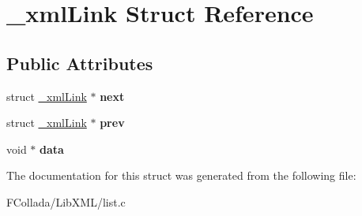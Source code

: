 \hypertarget{struct__xmlLink}{
\section{\_\-xmlLink Struct Reference}
\label{struct__xmlLink}
}
\subsection*{Public Attributes}
\begin{DoxyCompactItemize}
\item 
\hypertarget{struct__xmlLink_a9757f4af7556432076b1e4a85ba1e877}{
struct \hyperlink{struct__xmlLink}{\_\-xmlLink} $\ast$ {\bfseries next}}
\label{struct__xmlLink_a9757f4af7556432076b1e4a85ba1e877}

\item 
\hypertarget{struct__xmlLink_acb00bdb2cc98cd2c1a5037d86fac2917}{
struct \hyperlink{struct__xmlLink}{\_\-xmlLink} $\ast$ {\bfseries prev}}
\label{struct__xmlLink_acb00bdb2cc98cd2c1a5037d86fac2917}

\item 
\hypertarget{struct__xmlLink_a7787975913c1fc225cd3c538bb282c35}{
void $\ast$ {\bfseries data}}
\label{struct__xmlLink_a7787975913c1fc225cd3c538bb282c35}

\end{DoxyCompactItemize}


The documentation for this struct was generated from the following file:\begin{DoxyCompactItemize}
\item 
FCollada/LibXML/list.c\end{DoxyCompactItemize}
